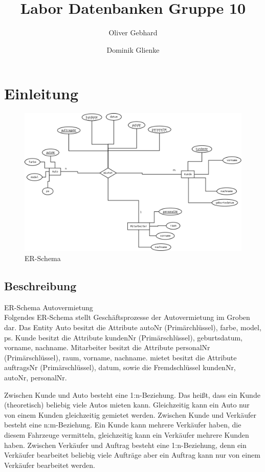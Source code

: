 \documentclass[a4paper,12pt]{article}
\begin{document}
\title{Labor Datenbanken Gruppe 10}
\author{ Oliver Gebhard \and Dominik Glienke }
\maketitle

\newpage
\tableofcontents
\newpage
\setcounter{tocdepth}{2}


\section{Einleitung}

\begin{figure}[h]
    \centering
    \includegraphics[scale=0.34]{ER_Schema_Autovermietung.png}
    \caption{ER-Schema}
    \label{Autovermietung}
\end{figure}

\subsection{Beschreibung}

ER-Schema Autovermietung \\

Folgendes ER-Schema stellt Geschäftsprozesse der Autovermietung im Groben dar. 
Das Entity 	Auto besitzt die Attribute autoNr (Primärchlüssel), farbe, model, ps.
		Kunde besitzt die Attribute kundenNr (Primärschlüssel), geburtsdatum, vorname, nachname.
Mitarbeiter besitzt die Attribute personalNr (Primärschlüssel), raum, vorname, nachname.
mietet besitzt die Attribute auftragsNr (Primärschlüssel), datum, sowie die Fremdschlüssel kundenNr, autoNr, personalNr.

Zwischen Kunde und Auto besteht eine 1:n-Beziehung. Das heißt, dass ein Kunde (theoretisch) beliebig viele Autos mieten kann. Gleichzeitig kann ein Auto nur von einem Kunden gleichzeitig gemietet werden.
Zwischen Kunde und Verkäufer besteht eine n:m-Beziehung. Ein Kunde kann mehrere Verkäufer haben, die diesem Fahrzeuge vermitteln, gleichzeitig kann ein Verkäufer mehrere Kunden haben.
Zwischen Verkäufer und Auftrag besteht eine 1:n-Beziehung, denn ein Verkäufer bearbeitet beliebig viele Aufträge aber ein Auftrag kann nur von einem Verkäufer bearbeitet werden.
\end{document}
